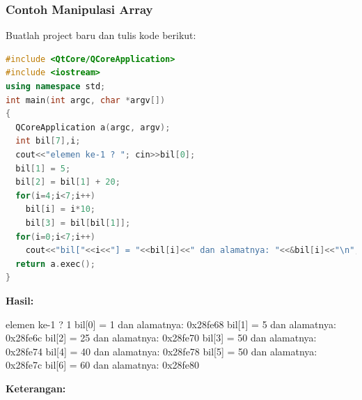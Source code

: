 \subsubsection*{Contoh  Manipulasi Array}

Buatlah project baru dan tulis kode berikut:

\begin{lstlisting}[language=c++, caption=Manipulasi Array, label=contoh3-2]
#include <QtCore/QCoreApplication>
#include <iostream>
using namespace std;
int main(int argc, char *argv[])
{
  QCoreApplication a(argc, argv);
  int bil[7],i;
  cout<<"elemen ke-1 ? "; cin>>bil[0];
  bil[1] = 5;
  bil[2] = bil[1] + 20;
  for(i=4;i<7;i++)
    bil[i] = i*10;
    bil[3] = bil[bil[1]];
  for(i=0;i<7;i++)
    cout<<"bil["<<i<<"] = "<<bil[i]<<" dan alamatnya: "<<&bil[i]<<"\n";
  return a.exec();
}
\end{lstlisting}

\textbf{Hasil:}

\begin{lcverbatim}
elemen ke-1 ? 1
bil[0] = 1 dan alamatnya: 0x28fe68
bil[1] = 5 dan alamatnya: 0x28fe6c
bil[2] = 25 dan alamatnya: 0x28fe70
bil[3] = 50 dan alamatnya: 0x28fe74
bil[4] = 40 dan alamatnya: 0x28fe78
bil[5] = 50 dan alamatnya: 0x28fe7c
bil[6] = 60 dan alamatnya: 0x28fe80
\end{lcverbatim}

\textbf{Keterangan:}


